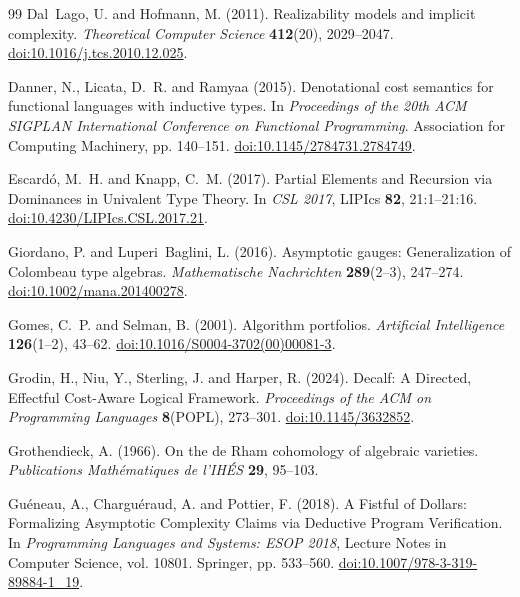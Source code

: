 \documentclass[11pt,a4paper]{article}
\numberwithin{algorithm}{section}
\numberwithin{equation}{section}
\theoremstyle{definition}
\theoremstyle{remark}
\theoremstyle{plain}
\theoremstyle{definition}
\theoremstyle{plain}
\begin{document}
\begin{thebibliography}{99}
Dal~Lago, U. and Hofmann, M. (2011).
Realizability models and implicit complexity.
\emph{Theoretical Computer Science} \textbf{412}(20), 2029--2047.
\href{https://doi.org/10.1016/j.tcs.2010.12.025}{doi:10.1016/j.tcs.2010.12.025}.

Danner, N., Licata, D.~R. and Ramyaa (2015).
Denotational cost semantics for functional languages with inductive types.
In \emph{Proceedings of the 20th ACM SIGPLAN International Conference on Functional Programming}. Association for Computing Machinery, pp. 140--151.
\href{https://doi.org/10.1145/2784731.2784749}{doi:10.1145/2784731.2784749}.

Escard{\'o}, M.~H. and Knapp, C.~M. (2017).
Partial Elements and Recursion via Dominances in Univalent Type Theory.
In \emph{CSL 2017}, LIPIcs \textbf{82}, 21:1--21:16.
\href{https://doi.org/10.4230/LIPIcs.CSL.2017.21}{doi:10.4230/LIPIcs.CSL.2017.21}.

Giordano, P. and Luperi~Baglini, L. (2016).
Asymptotic gauges: Generalization of {Colombeau} type algebras.
\emph{Mathematische Nachrichten} \textbf{289}(2--3), 247--274.
\href{https://doi.org/10.1002/mana.201400278}{doi:10.1002/mana.201400278}.

Gomes, C.~P. and Selman, B. (2001).
Algorithm portfolios.
\emph{Artificial Intelligence} \textbf{126}(1--2), 43--62.
\href{https://doi.org/10.1016/S0004-3702(00)00081-3}{doi:10.1016/S0004-3702(00)00081-3}.

Grodin, H., Niu, Y., Sterling, J. and Harper, R. (2024).
{Decalf}: A Directed, Effectful Cost-Aware Logical Framework.
\emph{Proceedings of the ACM on Programming Languages} \textbf{8}(POPL), 273--301.
\href{https://doi.org/10.1145/3632852}{doi:10.1145/3632852}.

Grothendieck, A. (1966).
On the de Rham cohomology of algebraic varieties.
\emph{Publications Math\'ematiques de l'IH\'ES} \textbf{29}, 95--103.

Gu{\'e}neau, A., Chargu{\'e}raud, A. and Pottier, F. (2018).
A Fistful of Dollars: Formalizing Asymptotic Complexity Claims via Deductive Program Verification.
In \emph{Programming Languages and Systems: ESOP 2018}, Lecture Notes in Computer Science, vol. 10801. Springer, pp. 533--560.
\href{https://doi.org/10.1007/978-3-319-89884-1_19}{doi:10.1007/978-3-319-89884-1\_19}.


\end{thebibliography}
\end{document}
